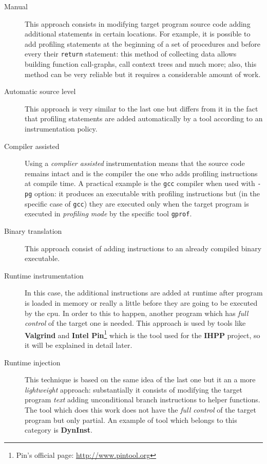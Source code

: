 \documentclass[a4paper,10pt]{report}
\begin{document}
\begin{description}
\begin{description}
\item[Manual]
This approach consists in modifying target program source code adding additional
statements in certain locations. For example, it is possible to add profiling
statements at the beginning of a set of procedures and before every their
\verb|return| statement: this method of collecting data allows building function
call-graphs, call context trees and much more; also, this method can be very
reliable but it requires a considerable amount of work.

\item[Automatic source level] This approach is very similar to the last one but
differs from it in the fact that profiling statements are added automatically by
a tool according to an instrumentation policy.

\item[Compiler assisted] Using a \emph{complier assisted} instrumentation means
that the source code remains intact and is the compiler the one who adds
profiling instructions at compile time. A practical example is the \verb|gcc| compiler when
used with \verb|-pg| option: it produces an executable with profiling
instructions but (in the specific case of \verb|gcc|) they are executed only when the
target program is executed in \emph{profiling mode} by the specific tool
\verb|gprof|.

\item[Binary translation]
This approach consist of adding instructions to an already compiled binary executable.

\item[Runtime instrumentation]
In this case, the additional instructions are added at runtime after program is
loaded in memory or really a little before they are going to be executed by the
cpu. In order to this to happen, another program which has \emph{full control}
of the target one is needed. This approach is used by tools like
\textbf{Valgrind} and \textbf{Intel Pin}\footnote{Pin's official page:
\url{http://www.pintool.org}} which is the tool used for the \textbf{IHPP}
project, so it will be explained in detail later.

\item[Runtime injection] This technique is based on the same idea of the last
one but it an a more \emph{lightweight} approach: substantially it consists of
modifying the target program \emph{text} adding unconditional branch
instructions to helper functions. The tool which does this work does not have the
\emph{full control} of the target program but only partial. An example of tool
which belongs to this category is \textbf{DynInst}.


\end{description}
\end{description}
\end{document}
